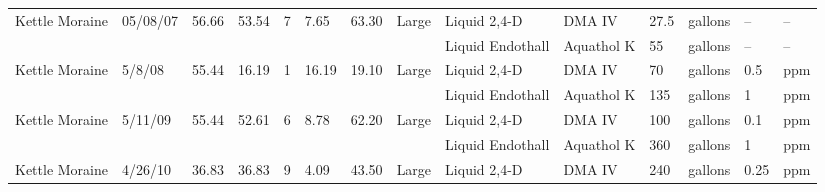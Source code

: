 \documentclass{article}
\begin{document}
\begin{landscape}
\begin{longtable}[l]{lp{14mm}Hp{10mm}HHp{14mm}p{9mm}p{30mm}p{18mm}lp{14mm}p{8mm}l}
  Kettle Moraine & 05/08/07 & 56.66 & 53.54 &   7 & 7.65 & 63.30 & Large & Liquid 2,4-D & DMA IV & 27.5 & gallons &   -- &  -- \\ 
  & & & & & & &  & Liquid Endothall & Aquathol K & 55 & gallons & -- & -- \\ 
  Kettle Moraine & 5/8/08 & 55.44 & 16.19 &   1 & 16.19 & 19.10 & Large & Liquid 2,4-D & DMA IV & 70 & gallons & 0.5 & ppm \\ 
  & & & & & & &  & Liquid Endothall & Aquathol K & 135 & gallons & 1 & ppm \\ 
  Kettle Moraine & 5/11/09 & 55.44 & 52.61 &   6 & 8.78 & 62.20 & Large & Liquid 2,4-D & DMA IV & 100 & gallons & 0.1 & ppm \\ 
  & & & & & & & & Liquid Endothall & Aquathol K & 360 & gallons & 1 & ppm \\ 
  Kettle Moraine & 4/26/10 & 36.83 & 36.83 &   9 & 4.09 & 43.50 & Large & Liquid 2,4-D & DMA IV & 240 & gallons & 0.25 & ppm \\
  
  \bottomrule
   

\end{longtable}
\end{landscape}
\end{document}
